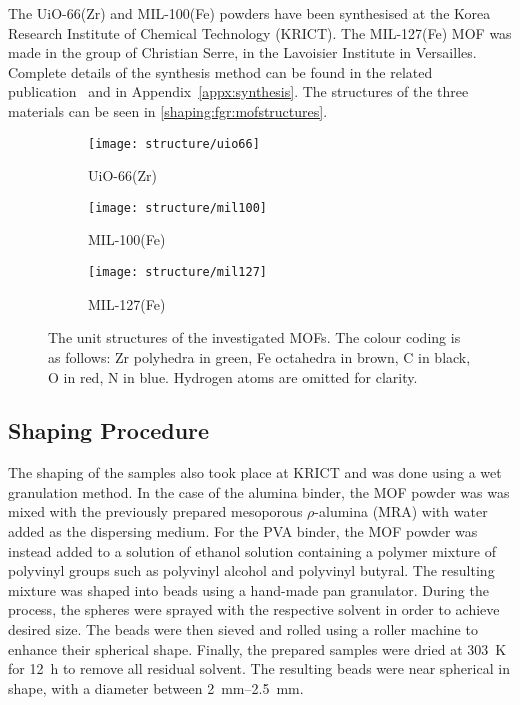 The UiO-66(Zr) and MIL-100(Fe) powders have been synthesised at the
Korea Research Institute of Chemical Technology (KRICT).
The MIL-127(Fe) MOF was made in the group of Christian Serre,
in the Lavoisier Institute in Versailles.
Complete details of the synthesis method can be found in the related
publication~\cite{valekarShapingPorousMetal2017}
and in Appendix~\ref{appx:synthesis}.
The structures of the three materials can be seen
in \autoref{shaping:fgr:mofstructures}.

\begin{figure}[htb]
	\centering
	\begin{subfigure}{0.3\textwidth}
		\texttt{[image: structure/uio66]}
		\caption{UiO-66(Zr)}
	\end{subfigure}
	\begin{subfigure}{0.3\textwidth}
		\texttt{[image: structure/mil100]}
		\caption{MIL-100(Fe)}
	\end{subfigure}
	\begin{subfigure}{0.3\textwidth}
		\texttt{[image: structure/mil127]}
		\caption{MIL-127(Fe)}
	\end{subfigure}

	\caption{The unit structures of the investigated MOFs.
		The colour coding is as follows: Zr polyhedra in green,
		Fe octahedra in brown, C in black, O in red, N in blue.
		Hydrogen atoms are omitted for clarity.}%
	\label{shaping:fgr:mofstructures}
\end{figure}

\subsection{Shaping Procedure}

The shaping of the samples also took place at KRICT and was done
using a wet granulation method. In the case of the alumina binder,
the MOF powder was was mixed with the previously prepared mesoporous
\( \rho \)-alumina (MRA) with water added as the dispersing medium. For the
PVA binder, the MOF powder was instead added to a solution of
ethanol solution containing a polymer mixture of polyvinyl groups
such as polyvinyl alcohol and polyvinyl butyral. The resulting
mixture was shaped into beads using a hand-made pan granulator.
During the process, the spheres were sprayed with the respective
solvent in order to achieve desired size. The beads were then sieved
and rolled using a roller machine to enhance their spherical
shape. Finally, the prepared samples were dried at \SI{303}{\kelvin}
for \SI{12}{\hour} to remove all residual solvent.
The resulting beads were near spherical in shape, with a diameter
between \SIrange{2}{2.5}{\milli\metre}.

